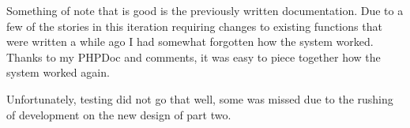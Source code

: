 Something of note that is good is the previously written documentation. Due to a few of the stories in this iteration requiring changes to existing functions that were written a while ago I had somewhat forgotten how the system worked. Thanks to my PHPDoc and comments, it was easy to piece together how the system worked again.

Unfortunately, testing did not go that well, some was missed due to the rushing of development on the new design of part two.
\newpage
